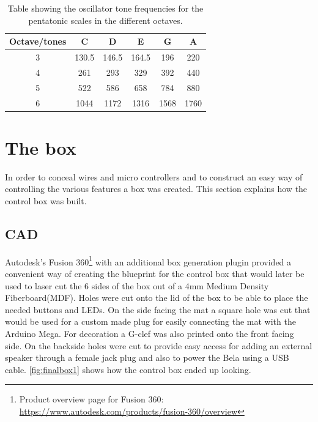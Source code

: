 	\begin{table}[H]
		\centering
		\caption{Table showing the oscillator tone frequencies for the pentatonic scales in the different octaves.}
		\label{tab:toneFreq}
		\begin{tabular}{|c|c|c|c|c|c|}
			\hline
			Octave/tones & C     & D     & E     & G    & A    \\ \hline
			3            & 130.5 & 146.5 & 164.5 & 196  & 220  \\ \hline
			4            & 261   & 293   & 329   & 392  & 440  \\ \hline
			5            & 522   & 586   & 658   & 784  & 880  \\ \hline
			6            & 1044  & 1172  & 1316  & 1568 & 1760 \\ \hline
		\end{tabular}
	\end{table}
	



\section{The box}%
In order to conceal wires and micro controllers and to construct an easy way of controlling the various features a box was created. This section explains how the control box was built.

	\subsection{CAD}
	Autodesk's Fusion 360\footnote{Product overview page for Fusion 360: \url{https://www.autodesk.com/products/fusion-360/overview}} with an additional box generation plugin provided a convenient way of creating the blueprint for the control box that would later be used to laser cut the 6 sides of the box out of a 4mm Medium Density Fiberboard(MDF). Holes were cut onto the lid of the box to be able to place the needed buttons and LEDs. On the side facing the mat a square hole was cut that would be used for a custom made plug for easily connecting the mat with the Arduino Mega. For decoration a G-clef was also printed onto the front facing side. On the backside holes were cut to provide easy access for adding an external speaker through a female jack plug and also to power the Bela using a USB cable. \autoref{fig:finalbox1} shows how the control box ended up looking.
	
